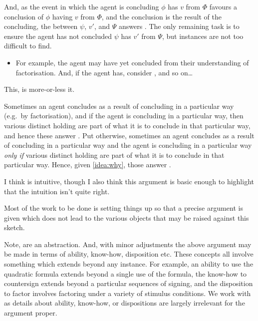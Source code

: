 \begin{note}
  And, as the event in which the agent is concluding \(\phi\) has  \(v\) from \(\Phi\) favours a conclusion of \(\phi\) having  \(v\) from \(\Phi\), and the conclusion is the result of the concluding, the \ros{} between \(\psi\), \(v'\), and \(\Psi\) answers \qWhy{}.
  The only remaining task is to ensure the agent has not concluded \(\psi\) has  \(v'\) from \(\Psi\), but instances are not too difficult to find.
  \begin{itemize}
  \item
    For example, the agent may have yet concluded  from their understanding of factorisation.
    And, if the agent has, consider , and so on\dots
  \end{itemize}
  This, is more-or-less it.

  Sometimes an agent concludes as a result of concluding in a particular way (e.g.\ by factorisation), and if the agent is concluding in a particular way, then various distinct  holding are part of what it is to conclude in that particular way, and hence these answer \qWhy{}.
  Put otherwise, sometimes an agent concludes as a result of concluding in a particular way and the agent is concluding in a particular way \emph{only if} various distinct  holding are part of what it is to conclude in that particular way.
  Hence, given \autoref{idea:why}, those \ros{} answer \qWhy{}.

  I think \issueInclusion{} is intuitive, though I also think this argument is basic enough to highlight that the intuition isn't quite right.

  Most of the work to be done is setting things up so that a precise argument is given which does not lead to the various objects that may be raised against this sketch.
\end{note}


\begin{note}
  Note,  are an abstraction.
  And, with minor adjustments the above argument may be made in terms of ability, know-how, disposition etc.
  These concepts all involve something which extends beyond any instance.
  For example, an ability to use the quadratic formula extends beyond a single use of the formula, the know-how to countersign extends beyond a particular sequences of signing, and the disposition to factor involves factoring under a variety of stimulus conditions.
  We work with  as details about ability, know-how, or dispositions are largely irrelevant for the argument proper.
\end{note}

